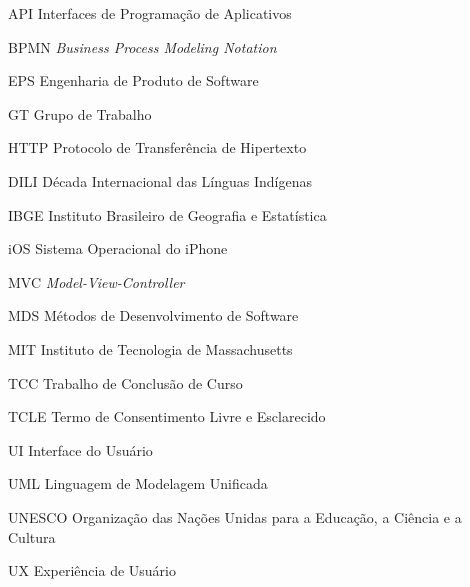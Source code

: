 \begin{siglas}
  \item[API] Interfaces de Programação de Aplicativos
  \item[BPMN] \textit{Business Process Modeling Notation}
  \item[EPS] Engenharia de Produto de Software
  \item[GT] Grupo de Trabalho
  \item[HTTP] Protocolo de Transferência de Hipertexto 
  \item[DILI] Década Internacional das Línguas Indígenas 
  \item[IBGE] Instituto Brasileiro de Geografia e Estatística
  \item[iOS] Sistema Operacional do iPhone 
  \item[MVC] \textit{Model-View-Controller}
  \item[MDS] Métodos de Desenvolvimento de Software
  \item[MIT] Instituto de Tecnologia de Massachusetts
  \item[TCC] Trabalho de Conclusão de Curso 
  \item[TCLE] Termo de Consentimento Livre e Esclarecido 
  \item[UI] Interface do Usuário
  \item[UML] Linguagem de Modelagem Unificada
  \item[UNESCO] Organização das Nações Unidas para a Educação, a Ciência e a Cultura
  \item[UX] Experiência de Usuário
\end{siglas}
